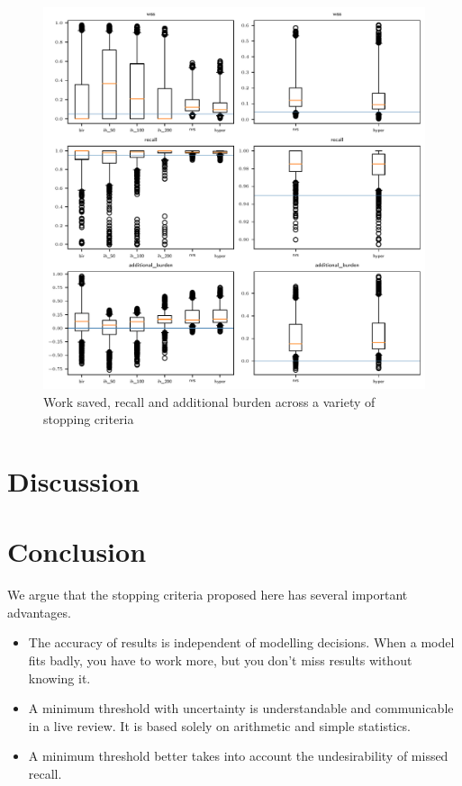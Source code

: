 \documentclass{bmcart}
\begin{document}
	\begin{figure}
	\includegraphics[width=\linewidth]{../images/wss_recall_burden_boxplot}
	\caption{Work saved, recall and additional burden across a variety of stopping criteria}
	\label{additional-burden-missed-recall}
\end{figure}

	
	
	
	
	\section*{Discussion}
	
	\section*{Conclusion}
	
	We argue that the stopping criteria proposed here has several important advantages.
	
	\begin{itemize}
		\item The accuracy of results is independent of modelling decisions. When a model fits badly, you have to work more, but you don't miss results without knowing it.
		\item A minimum threshold with uncertainty is understandable and communicable in a live review. It is based solely on arithmetic and simple statistics.
		\item A minimum threshold better takes into account the undesirability of missed recall.
	\end{itemize}
	
\end{document}
